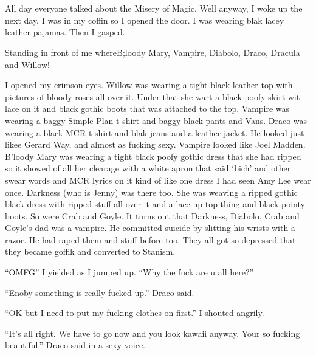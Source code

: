 \section{}



All day everyone talked about the Misery of Magic. Well anyway, I woke up the next day. I was in my coffin so I opened the door. I was wearing blak lacey leather pajamas. Then I gasped.

Standing in front of me where\dotfill\newline B;loody Mary, Vampire, Diabolo, Draco, Dracula and Willow!

I opened my crimson eyes. Willow was wearing a tight black leather top with pictures of bloody roses all over it. Under that she wart a black poofy skirt wit lace on it and black gothic boots that was attached to the top. Vampire was wearing a baggy Simple Plan t-shirt and baggy black pants and Vans. Draco was wearing a black MCR t-shirt and blak jeans and a leather jacket. He looked just likee Gerard Way, and almost as fucking sexy. Vampire looked like Joel Madden. B'loody Mary was wearing a tight black poofy gothic dress that she had ripped so it showed of all her clearage with a white apron that said \enquote*{bich} and other swear words and MCR lyrics on it kind of like one dress I had seen Amy Lee wear once. Darkness (who is Jenny) was there too. She was weaving a ripped gothic black dress with ripped stuff all over it and a lace-up top thing and black pointy boots. So were Crab and Goyle. It turns out that Darkness, Diabolo, Crab and Goyle's dad was a vampire. He committed suicide by slitting his wrists with a razor. He had raped them and stuff before too. They all got so depressed that they became goffik and converted to Stanism.

\enquote{OMFG} I yielded as I jumped up. \enquote{Why the fuck are u all here?}

\enquote{Enoby something is really fucked up.} Draco said.

\enquote{OK but I need to put my fucking clothes on first.} I shouted angrily.

\enquote{It's all right. We have to go now and you look kawaii anyway. Your so fucking beautiful.} Draco said in a sexy voice.

